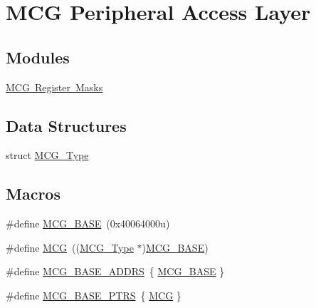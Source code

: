 \hypertarget{group___m_c_g___peripheral___access___layer}{}\section{M\+CG Peripheral Access Layer}
\label{group___m_c_g___peripheral___access___layer}
\subsection*{Modules}
\begin{DoxyCompactItemize}
\item 
\mbox{\hyperlink{group___m_c_g___register___masks}{M\+C\+G Register Masks}}
\end{DoxyCompactItemize}
\subsection*{Data Structures}
\begin{DoxyCompactItemize}
\item 
struct \mbox{\hyperlink{struct_m_c_g___type}{M\+C\+G\+\_\+\+Type}}
\end{DoxyCompactItemize}
\subsection*{Macros}
\begin{DoxyCompactItemize}
\item 
\#define \mbox{\hyperlink{group___m_c_g___peripheral___access___layer_gaad20a4618a24bbbb2edab9643eb6db29}{M\+C\+G\+\_\+\+B\+A\+SE}}~(0x40064000u)
\item 
\#define \mbox{\hyperlink{group___m_c_g___peripheral___access___layer_gad7ea2d93cafdbe9298ef1dd52be44f88}{M\+CG}}~((\mbox{\hyperlink{struct_m_c_g___type}{M\+C\+G\+\_\+\+Type}} $\ast$)\mbox{\hyperlink{group___m_c_g___peripheral___access___layer_gaad20a4618a24bbbb2edab9643eb6db29}{M\+C\+G\+\_\+\+B\+A\+SE}})
\item 
\#define \mbox{\hyperlink{group___m_c_g___peripheral___access___layer_gab7ba0907fd63f1e70dddac601e4f9dd9}{M\+C\+G\+\_\+\+B\+A\+S\+E\+\_\+\+A\+D\+D\+RS}}~\{ \mbox{\hyperlink{group___m_c_g___peripheral___access___layer_gaad20a4618a24bbbb2edab9643eb6db29}{M\+C\+G\+\_\+\+B\+A\+SE}} \}
\item 
\#define \mbox{\hyperlink{group___m_c_g___peripheral___access___layer_ga3e6aec328b7327acc1f7bff70bec388c}{M\+C\+G\+\_\+\+B\+A\+S\+E\+\_\+\+P\+T\+RS}}~\{ \mbox{\hyperlink{group___m_c_g___peripheral___access___layer_gad7ea2d93cafdbe9298ef1dd52be44f88}{M\+CG}} \}
\end{DoxyCompactItemize}


